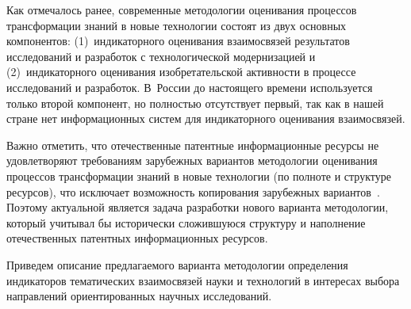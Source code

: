 \begin{multicols}{2}
    Как отмечалось ранее, современные методологии оценивания процессов трансформации 
знаний в новые технологии состоят из двух основных компонентов: (1)~индикаторного 
оценивания взаимосвязей результатов исследований и разработок с технологической 
модернизацией и (2)~индикаторного оценивания изобретательской активности в процессе 
исследований и разработок. В~России до настоящего времени используется только второй 
компонент, но полностью отсутствует первый, так как в нашей стране нет информационных 
систем для индикаторного оценивания взаимосвязей.
  
  Важно отметить, что отечественные патентные информационные ресурсы не удовлетворяют 
требованиям зарубежных вариантов методологии оценивания процессов трансформации знаний 
в новые технологии (по полноте и структуре ресурсов), что исключает возможность 
копирования зарубежных вариантов~\cite{3-zat, 4-zat}. Поэтому актуальной является задача 
разработки нового варианта методологии, который учитывал бы исторически сложившуюся 
структуру и наполнение отечественных патентных информационных ресурсов.
  
  Приведем описание предлагаемого варианта методологии определения индикаторов 
тематических взаимосвязей науки и технологий в интересах выбора направлений 
ориентированных научных исследований.
  

\end{multicols}

